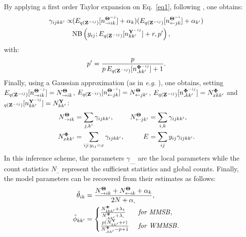 By applying a first order Taylor expansion on Eq.~\eqref{eq1}, following \cite{teh2007collapsed}, one obtains:
%
\begin{align*}
\gamma_{ijkk'} \propto & (E_{q({\mathbf{Z}}^{-ij})}[n_{\rightarrow ik}^{{\boldsymbol{\Theta}}^{-j}}] + \alpha_k) (E_{q({\mathbf{Z}}^{-ij})}[n_{\leftarrow jk}^{{\boldsymbol{\Theta}}^{-i}}] + \alpha_{k'}) \\
& \mathrm{NB}\left(y_{ij}; E_{q({\mathbf{Z}}^{-ij})}[n^{{\mathbf{Y}}^{-ij}}_{kk'}] + r,  p' \right),
\end{align*}
%
with:
%
\[
p' = \frac{p}{p\,E_{q({\mathbf{Z}}^{-ij})}[n^{{\boldsymbol{\Phi}}^{-ij}}_{\bm{.}kk'}] + 1}.
\]
%
Finally, using a Gaussian approximation (as in \textit{e.g.} \cite{asuncion2009smoothing}), one obtains, setting $E_{q({\mathbf{Z}}^{-ij})}[n_{\rightarrow ik}^{{\boldsymbol{\Theta}}^{-j}}] = N^{{\boldsymbol{\Theta}}}_{\rightarrow ik}$, $E_{q({\mathbf{Z}}^{-ij})}[n_{\leftarrow jk}^{{\boldsymbol{\Theta}}^{-i}}] = N^{{\boldsymbol{\Theta}}}_{\leftarrow jk'}$, $E_{q({\mathbf{Z}}^{-ij})}[n^{{\boldsymbol{\Phi}}^{-ij}}_{\bm{.}kk'}] = N^{{\boldsymbol{\Phi}}}_{xkk'}$ and $_{q({\mathbf{Z}}^{-ij})}[n^{{\mathbf{Y}}^{-ij}}_{kk'}] = N^{{\mathbf{Y}}}_{kk'}$:
%
\begin{align} \label{eq:sss}
   N^{{\boldsymbol{\Theta}}}_{\rightarrow ik} &= \sum_{j, k'} \gamma_{ijkk'},       & N^{{\boldsymbol{\Theta}}}_{\leftarrow jk'} &= \sum_{i, k} \gamma_{ijkk'},  \nonumber \\
   N^{{\boldsymbol{\Phi}}}_{xkk'} &= \sum_{ij:y_{ij}=x} \gamma_{ijkk'},  & E &= \sum_{ij} y_{ij}\gamma_{ijkk'}.
\end{align}
%
In this inference scheme, the parameters $\gamma_{....}$ are the local parameters while the count statistics $N^{.}_{..}$ represent the sufficient statistics and global counts. Finally, the model parameters can be recovered from their estimates as follows:
%
\begin{align*}
\hat \theta_{ik} &= \frac{N^{{\Bs{\Theta}}}_{\rightarrow ik} + N^{{\Bs{\Theta}}}_{\leftarrow ik} + \alpha_k}{2N + \alpha_{\bm{.}}}, \\
\hat \phi_{kk'}&=\begin{cases}
     \frac{N^{{\Bs{\Phi}}}_{1 kk'} + \lambda_1}{N^{{\Bs{\Phi}}}_{\bm{.}kk'} + \lambda_{\bm{.}}} & \textrm{ \textit{for MMSB}}, \\
    \frac{p(N^{\B{Y}}_{kk'} + r)}{N^{{\Bs{\Phi}}}_{\bm{.}kk'} - p + 1}  & \textrm{ \textit{for WMMSB}}.  %
    \end{cases}
\end{align*}


